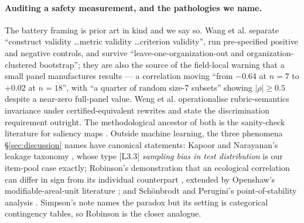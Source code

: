 \documentclass[11pt,letterpaper]{article}
\begin{document}
\paragraph{Auditing a safety measurement, and the pathologies we name.} The battery framing is prior art in kind and we say so. Wang et al. \citep{Wang2026} separate ``construct validity \ldots metric validity \ldots criterion validity'', run pre-specified positive and negative controls, and survive ``leave-one-organization-out and organization-clustered bootstrap''; they are also the source of the field-local warning that a small panel manufactures results --- a correlation moving ``from $-0.64$ at $n=7$ to $+0.02$ at $n=18$'', with ``a quarter of random size-7 subsets'' showing $|\rho| \geq 0.5$ despite a near-zero full-panel value. Weng et al. \citep{Weng2026} operationalise rubric-semantics invariance under certified-equivalent rewrites and state the discrimination requirement outright. The methodological ancestor of both is the sanity-check literature for saliency maps \citep{Adebayo2018}. Outside machine learning, the three phenomena \S\ref{sec:discussion} names have canonical statements: Kapoor and Narayanan's leakage taxonomy \citep{Kapoor2023}, whose type [L3.3] \emph{sampling bias in test distribution} is our item-pool case exactly; Robinson's demonstration that an ecological correlation can differ in sign from its individual counterpart \citep{Robinson1950}, extended by Openshaw's modifiable-areal-unit literature \citep{Openshaw1984}; and Sch\"onbrodt and Perugini's point-of-stability analysis \citep{Schonbrodt2013,Schonbrodt2018}. Simpson's note \citep{Simpson1951} names the paradox but its setting is categorical contingency tables, so Robinson is the closer analogue.
\end{document}
